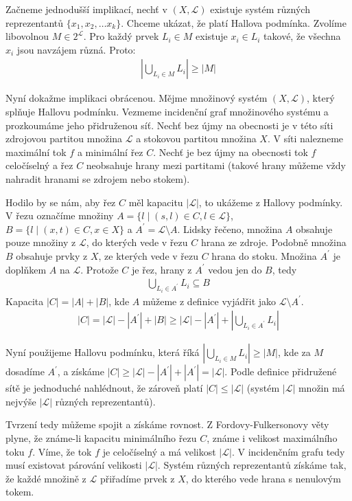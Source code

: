 \begin{t_proof}
  Začneme jednodušší implikací, nechť v $(X,\mathcal{L})$ existuje systém různých reprezentantů $\{x_1,x_2,\dots x_k\}$. Chceme ukázat, že platí Hallova podmínka. Zvolíme libovolnou $M\in2^\mathcal{L}$. Pro každý prvek $L_i\in M$ existuje $x_i\in L_i$ takové, že všechna $x_i$ jsou navzájem různá. Proto:
  \begin{align*}
    \left|\bigcup_{L_i\in M} L_i\right|\geq |M|
  \end{align*}
  
  Nyní dokažme implikaci obrácenou. Mějme množinový systém $(X,\mathcal{L})$, který splňuje Hallovu podmínku. Vezmeme incidenční graf množinového systému a prozkoumáme jeho přidruženou síť. Nechť bez újmy na obecnosti je v této síti zdrojovou partitou množina $\mathcal{L}$ a stokovou partitou množina $X$. V síti nalezneme maximální tok $f$ a minimální řez $C$. Nechť je bez újmy na obecnosti tok $f$ celočíselný a řez $C$ neobsahuje hrany mezi partitami (takové hrany můžeme vždy nahradit hranami se zdrojem nebo stokem).
  
  Hodilo by se nám, aby řez $C$ měl kapacitu $|\mathcal{L}|$, to ukážeme z Hallovy podmínky. V řezu označíme množiny $A=\{l\mid (s,l)\in C, l\in\mathcal{L}\}$, $B=\{l\mid (x,t)\in C, x\in X\}$ a $A^\prime=\mathcal{L}\setminus A$. Lidsky řečeno, množina $A$ obsahuje pouze množiny z $\mathcal{L}$, do kterých vede v řezu $C$ hrana ze zdroje. Podobně množina $B$ obsahuje prvky z $X$, ze kterých vede v řezu $C$ hrana do stoku. Množina $A^\prime$ je doplňkem $A$ na $\mathcal{L}$. Protože $C$ je řez, hrany z $A^\prime$ vedou jen do $B$, tedy
  \begin{align*}
    \bigcup_{L_i\in A^\prime}L_i\subseteq B
  \end{align*}
  Kapacita $|C|=|A|+|B|$, kde $A$ můžeme z definice vyjádřit jako $\mathcal{L}\setminus A^\prime$.
  \begin{align*}
    |C|=|\mathcal{L}|-|A^\prime|+|B|\geq |\mathcal{L}|-|A^\prime|+\left|\bigcup_{L_i\in A^\prime}L_i\right|
  \end{align*}
  
  Nyní použijeme Hallovu podmínku, která říká $\left|\bigcup_{L_i\in M} L_i\right|\geq |M|$, kde za $M$ dosadíme $A^\prime$, a získáme $|C|\geq |\mathcal{L}|-|A^\prime|+|A^\prime|=|\mathcal{L}|$. Podle definice přidružené sítě je jednoduché nahlédnout, že zároveň platí $|C|\leq|\mathcal{L}|$ (systém $|\mathcal{L}|$ množin má nejvýše $|\mathcal{L}|$ různých reprezentantů).
  
  Tvrzení tedy můžeme spojit a získáme rovnost. Z Fordovy-Fulkersonovy věty plyne, že známe-li kapacitu minimálního řezu $C$, známe i velikost maximálního toku $f$. Víme, že tok $f$ je celočíselný a má velikost $|\mathcal{L}|$. V incidenčním grafu tedy musí existovat párování velikosti $|\mathcal{L}|$. Systém různých reprezentantů získáme tak, že každé množině z $\mathcal{L}$ přiřadíme prvek z $X$, do kterého vede hrana s nenulovým tokem.
\end{t_proof}

